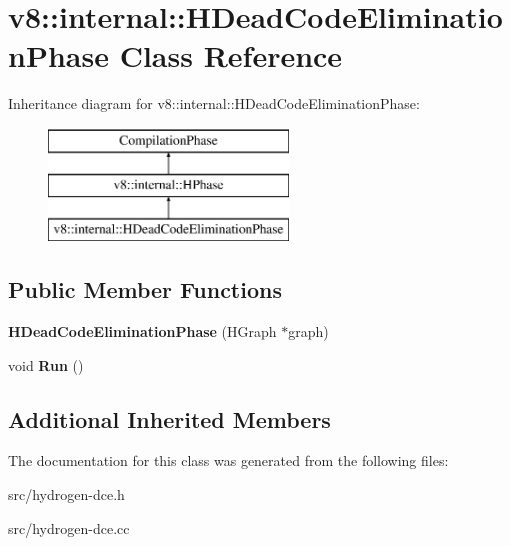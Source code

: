 \hypertarget{classv8_1_1internal_1_1_h_dead_code_elimination_phase}{}\section{v8\+:\+:internal\+:\+:H\+Dead\+Code\+Elimination\+Phase Class Reference}
\label{classv8_1_1internal_1_1_h_dead_code_elimination_phase}
Inheritance diagram for v8\+:\+:internal\+:\+:H\+Dead\+Code\+Elimination\+Phase\+:\begin{figure}[H]
\begin{center}
\leavevmode
\includegraphics[height=3.000000cm]{classv8_1_1internal_1_1_h_dead_code_elimination_phase}
\end{center}
\end{figure}
\subsection*{Public Member Functions}
\begin{DoxyCompactItemize}
\item 
\hypertarget{classv8_1_1internal_1_1_h_dead_code_elimination_phase_a7fffb6b1cbfd8e7dbedad366aba5b69b}{}{\bfseries H\+Dead\+Code\+Elimination\+Phase} (H\+Graph $\ast$graph)\label{classv8_1_1internal_1_1_h_dead_code_elimination_phase_a7fffb6b1cbfd8e7dbedad366aba5b69b}

\item 
\hypertarget{classv8_1_1internal_1_1_h_dead_code_elimination_phase_a29fada16a710d5a6dcb6b0aa2af5d936}{}void {\bfseries Run} ()\label{classv8_1_1internal_1_1_h_dead_code_elimination_phase_a29fada16a710d5a6dcb6b0aa2af5d936}

\end{DoxyCompactItemize}
\subsection*{Additional Inherited Members}


The documentation for this class was generated from the following files\+:\begin{DoxyCompactItemize}
\item 
src/hydrogen-\/dce.\+h\item 
src/hydrogen-\/dce.\+cc\end{DoxyCompactItemize}
